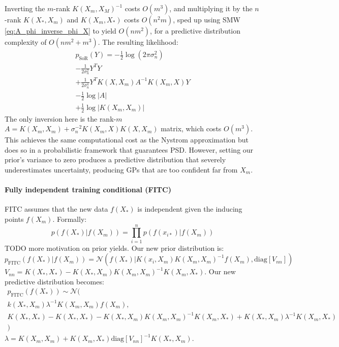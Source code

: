 Inverting the $m$-rank $K(X_m, X_M)^{-1}$ costs $O(m^3)$, and multiplying it by the $n$-rank $K(X_*, X_m)$ and $K(X_m, X_*)$ costs $O(n^2m)$, sped up using SMW \ref{eq:A_phi_inverse_phi_X} to yield $O(nm^2)$, for a predictive distribution complexity of $O(nm^2 + m^3)$. The resulting likelihood:
\begin{equation*}
    \begin{aligned}
        p_{\text{SoR}}(Y) = -\frac{1}{2} \log(2 \pi \sigma_n^2) \\
        - \frac{1}{2\sigma_n^2} Y ^T Y \\
        + \frac{1}{2\sigma_n^4} Y^T K(X, X_m) A^{-1} K(X_m, X) Y \\ 
        - \frac{1}{2} \log | A | \\
        + \frac{1}{2} \log | K(X_m, X_m) |
    \end{aligned}
\end{equation*}
The only inversion here is the rank-$m$ $A = K(X_m, X_m) + \sigma_n^{-2} K(X_m, X) K(X, X_m)$ matrix, which costs $O(m^3)$. This achieves the same computational cost as the Nystrom approximation but does so in a probabilistic framework that guarantees PSD. However, setting our prior's variance to zero produces a predictive distribution that severely underestimates uncertainty, producing GPs that are too confident far from $X_m$.

\paragraph{Fully independent training conditional (FITC) \cite{fitc}}
FITC assumes that the new data $f(X_*)$ is independent given the inducing points $f(X_m)$. Formally:
\begin{equation*}
    p(f(X_*) | f(X_m)) = \prod_{i=1}^n p(f(x_{i*}) | f(X_m))
\end{equation*}
TODO more motivation on prior yields. Our new prior distribution is:
\begin{equation*}
    p_{\text{FITC}}(f(X_*) | f(X_m)) = \mathcal{N}(
    f(X_*) | K(x_i, X_m) K(X_m, X_m)^{-1} f(X_m),
    \text{diag}[V_{nn}] 
    )
\end{equation*}
$V_{nn} = K(X_*, X_*) - K(X_*, X_m) K(X_m, X_m)^{-1} K(X_m, X_*)$. Our new predictive distribution becomes:
\begin{equation*}
    \begin{aligned}
        p_{\text{FITC}}(f(X_*)) \sim \mathcal{N}( \\
        k(X_*, X_m) \lambda^{-1} K(X_m, X_m) f(X_m), \\
        K(X_*, X_*) - K(X_*, X_*) - K(X_*, X_m) K(X_m, X_m)^{-1} K(X_m, X_*) + K(X_*, X_m) \lambda^{-1} K(X_m, X_*) \\
        )
    \end{aligned}
\end{equation*}
$\lambda = K(X_m, X_m) + K(X_m, X_*) \text{diag}[V_{nn}]^{-1} K(X_*, X_m)$. 

